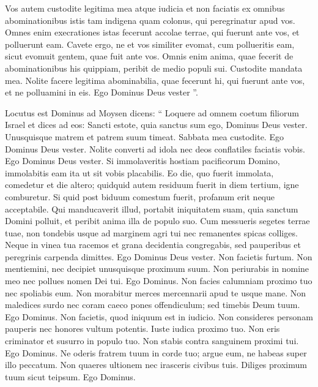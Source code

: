 \begin{biblechapter}
\begin{biblechapter}
\begin{biblechapter}
\begin{biblechapter}
\begin{biblechapter}
\begin{biblechapter}
\begin{biblechapter}
\begin{biblechapter}
\begin{biblechapter}
\begin{biblechapter}
\begin{biblechapter}
\begin{biblechapter}
\begin{biblechapter}
\begin{biblechapter}
\begin{biblechapter}
\begin{biblechapter}
\begin{biblechapter}
\begin{biblechapter}
\verse Vos autem custodite legitima mea atque iudicia et non faciatis ex omnibus abominationibus istis tam indigena quam colonus, qui peregrinatur apud vos. 
\verse Omnes enim execrationes istas fecerunt accolae terrae, qui fuerunt ante vos, et polluerunt eam. 
\verse Cavete ergo, ne et vos similiter evomat, cum pollueritis eam, sicut evomuit gentem, quae fuit ante vos. 
\verse Omnis enim anima, quae fecerit de abominationibus his quippiam, peribit de medio populi sui. 
\verse Custodite mandata mea. Nolite facere legitima abominabilia, quae fecerunt hi, qui fuerunt ante vos, et ne polluamini in eis. Ego Dominus Deus vester ”.
 
\begin{biblechapter}
\verse Locutus est Dominus ad Moysen dicens: 
\verse “ Loquere ad omnem coetum filiorum Israel et dices ad eos: Sancti estote, quia sanctus sum ego, Dominus Deus vester.
 \verse Unusquisque matrem et patrem suum timeat. Sabbata mea custodite. Ego Dominus Deus vester.
 \verse Nolite converti ad idola nec deos conflatiles faciatis vobis. Ego Dominus Deus vester.
 \verse Si immolaveritis hostiam pacificorum Domino, immolabitis eam ita ut sit vobis placabilis. 
\verse Eo die, quo fuerit immolata, comedetur et die altero; quidquid autem residuum fuerit in diem tertium, igne comburetur. 
\verse Si quid post biduum comestum fuerit, profanum erit neque acceptabile. 
\verse Qui manducaverit illud, portabit iniquitatem suam, quia sanctum Domini polluit, et peribit anima illa de populo suo.
 \verse Cum messueris segetes terrae tuae, non tondebis usque ad marginem agri tui nec remanentes spicas colliges. 
\verse Neque in vinea tua racemos et grana decidentia congregabis, sed pauperibus et peregrinis carpenda dimittes. Ego Dominus Deus vester.
 \verse Non facietis furtum. Non mentiemini, nec decipiet unusquisque proximum suum.
 \verse Non periurabis in nomine meo nec pollues nomen Dei tui. Ego Dominus.
 \verse Non facies calumniam proximo tuo nec spoliabis eum. Non morabitur merces mercennarii apud te usque mane.
 \verse Non maledices surdo nec coram caeco pones offendiculum; sed timebis Deum tuum. Ego Dominus.
 \verse Non facietis, quod iniquum est in iudicio. Non consideres personam pauperis nec honores vultum potentis. Iuste iudica proximo tuo. 
\verse Non eris criminator et susurro in populo tuo. Non stabis contra sanguinem proximi tui. Ego Dominus.
 \verse Ne oderis fratrem tuum in corde tuo; argue eum, ne habeas super illo peccatum. 
\verse Non quaeres ultionem nec irasceris civibus tuis. Diliges proximum tuum sicut teipsum. Ego Dominus.

\end{biblechapter}
\end{biblechapter}
\end{biblechapter}
\end{biblechapter}
\end{biblechapter}
\end{biblechapter}
\end{biblechapter}
\end{biblechapter}
\end{biblechapter}
\end{biblechapter}
\end{biblechapter}
\end{biblechapter}
\end{biblechapter}
\end{biblechapter}
\end{biblechapter}
\end{biblechapter}
\end{biblechapter}
\end{biblechapter}
\end{biblechapter}
